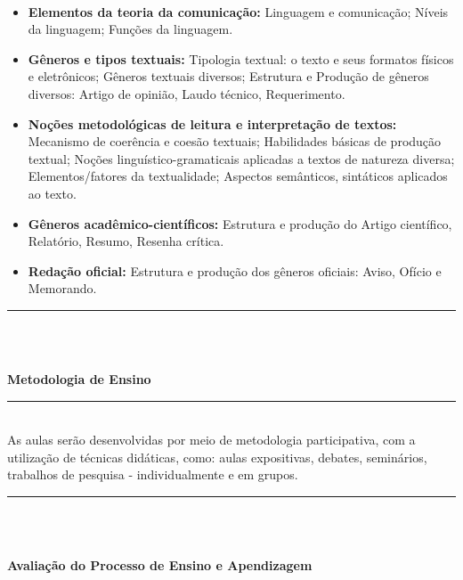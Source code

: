 \\
\begin{itemize}
 \item \textbf{Elementos da teoria da comunicação:} Linguagem e comunicação; Níveis da linguagem; Funções da linguagem.

 \item \textbf{Gêneros e tipos textuais:} Tipologia textual: o texto e seus formatos físicos e eletrônicos; Gêneros textuais diversos; Estrutura e Produção de gêneros diversos: Artigo de opinião, Laudo técnico, Requerimento.

 \item \textbf{Noções metodológicas de leitura e interpretação de textos:} Mecanismo de coerência e coesão textuais; Habilidades básicas de produção textual; Noções linguístico-gramaticais aplicadas a textos de natureza diversa; Elementos/fatores da textualidade; Aspectos semânticos, sintáticos aplicados ao texto.

 \item \textbf{Gêneros acadêmico-científicos:} Estrutura e produção do Artigo científico, Relatório, Resumo, Resenha crítica.

 \item \textbf{Redação oficial:} Estrutura e produção dos gêneros oficiais: Aviso, Ofício e Memorando.

\end{itemize}
\noindent\rule{16.5cm}{0.4pt}\\
\\
\vspace{-12mm}
\begin{center}\textbf{Metodologia de Ensino}\end{center} 
\vspace{-5mm}
\noindent\rule{16.5cm}{0.4pt}
\\
   As aulas serão desenvolvidas por meio de metodologia participativa, com a utilização de técnicas didáticas, como: aulas expositivas, debates, seminários, trabalhos de pesquisa - individualmente e em grupos.\\
\noindent\rule{16.5cm}{0.4pt}\\
\\
\vspace{-12mm}
\begin{center}\textbf{Avaliação do Processo de Ensino e Apendizagem}\end{center}
\vspace{-5mm}
